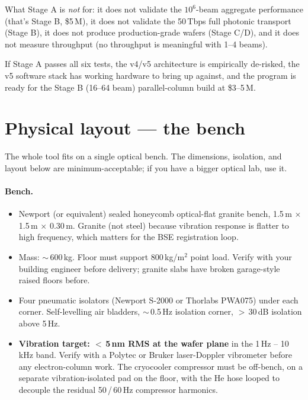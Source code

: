 \documentclass[11pt,letterpaper]{article}
\begin{document}
What Stage A is \textit{not} for: it does not validate the $10^6$-beam aggregate performance (that's Stage B, \$5\,M), it does not validate the 50\,Tbps full photonic transport (Stage B), it does not produce production-grade wafers (Stage C/D), and it does not measure throughput (no throughput is meaningful with 1--4 beams).

If Stage A passes all six tests, the v4/v5 architecture is empirically de-risked, the v5 software stack has working hardware to bring up against, and the program is ready for the Stage B (16--64 beam) parallel-column build at \$3--5\,M.

\section{Physical layout --- the bench}

The whole tool fits on a single optical bench. The dimensions, isolation, and layout below are minimum-acceptable; if you have a bigger optical lab, use it.

\paragraph{Bench.}
\begin{itemize}[leftmargin=1.6em]
  \item Newport (or equivalent) sealed honeycomb optical-flat granite bench, 1.5\,m $\times$ 1.5\,m $\times$ 0.30\,m. Granite (not steel) because vibration response is flatter to high frequency, which matters for the BSE registration loop.
  \item Mass: $\sim$\,600\,kg. Floor must support 800\,kg/m$^2$ point load. Verify with your building engineer before delivery; granite slabs have broken garage-style raised floors before.
  \item Four pneumatic isolators (Newport S-2000 or Thorlabs PWA075) under each corner. Self-levelling air bladders, $\sim$\,0.5\,Hz isolation corner, $>$\,30\,dB isolation above 5\,Hz.
  \item \textbf{Vibration target: $<$\,5\,nm RMS at the wafer plane} in the 1\,Hz -- 10\,kHz band. Verify with a Polytec or Bruker laser-Doppler vibrometer before any electron-column work. The cryocooler compressor must be off-bench, on a separate vibration-isolated pad on the floor, with the He hose looped to decouple the residual 50\,/\,60\,Hz compressor harmonics.
\end{itemize}
\end{document}
